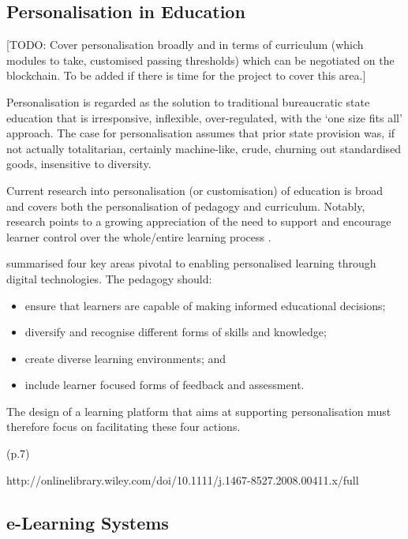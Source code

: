 \subsection{Personalisation in Education}

[TODO: Cover personalisation broadly and in terms of curriculum (which modules to take,
	customised passing thresholds) which can be negotiated on the blockchain.
	To be added if there is time for the project to cover this area.]

Personalisation is regarded as the solution to traditional bureaucratic state education that is irresponsive,
inflexible, over-regulated, with the ‘one size fits all’ approach. The case for personalisation assumes that prior state
provision was, if not actually totalitarian, certainly machine-like, crude, churning out standardised goods,
insensitive to diversity. \citep{bragg2014review}

Current research into personalisation (or customisation) of education is broad and covers both the personalisation
of pedagogy and curriculum. Notably, research points to a growing appreciation of the need to support and
encourage learner control over the whole/entire learning process \citep{dron2007designing}.

\citet{green2005futurelab} summarised four key areas pivotal to enabling personalised learning through digital
technologies. The pedagogy should:

\begin{itemize}
	\setlength\itemsep{0em}
	\item ensure that learners are capable of making informed educational decisions;
	\item diversify and recognise different forms of skills and knowledge;
	\item create diverse learning environments; and
	\item include learner focused forms of feedback and assessment.
\end{itemize}

The design of a learning platform that aims at supporting personalisation must therefore focus on facilitating these
four actions.


(p.7)

http://onlinelibrary.wiley.com/doi/10.1111/j.1467-8527.2008.00411.x/full

\subsection{e-Learning Systems}

